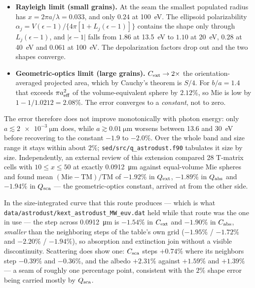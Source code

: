 \documentclass{my_memo}
\begin{document}
\begin{itemize}
  \item \textbf{Rayleigh limit (small grains).} At the seam the
        smallest populated radius has $x = 2\pi a/\lambda = 0.033$, and
        only $0.24$ at \SI{100}{\electronvolt}. The ellipsoid
        polarizability
        $\alpha_j = V(\epsilon-1)/\{4\pi[1+L_j(\epsilon-1)]\}$ contains
        the shape only through $L_j(\epsilon-1)$, and $|\epsilon-1|$
        falls from $1.86$ at \SI{13.5}{\electronvolt} to $1.10$ at
        \SI{20}{\electronvolt}, $0.28$ at \SI{40}{\electronvolt} and
        $0.061$ at \SI{100}{\electronvolt}. The depolarization factors
        drop out and the two shapes converge.
  \item \textbf{Geometric-optics limit (large grains).}
        $C_{\rm ext}\to2\times$ the orientation-averaged projected
        area, which by Cauchy's theorem is $S/4$. For $b/a = 1.4$ that
        exceeds $\pi a_{\rm eff}^2$ of the volume-equivalent sphere by
        $2.12\%$, so Mie is low by $1-1/1.0212 = 2.08\%$. The error
        converges to a \emph{constant}, not to zero.
\end{itemize}

\noindent The error therefore does not improve monotonically with
photon energy: only $a\lesssim\SI{2e-3}{\micro\meter}$ does, while
$a\gtrsim\SI{0.01}{\micro\meter}$ worsens between 13.6 and
\SI{30}{\electronvolt} before recovering to the constant $-1.9$ to
$-2.0\%$. Over the whole band and size range it stays within about
$2\%$; \texttt{sed/src/q\_astrodust.f90} tabulates it size by size.
Independently, an external review of this extension compared 28
T-matrix cells with $10\le x\le50$ at exactly
\SI{0.0912}{\micro\meter} against equal-volume Mie spheres and found
mean $(\mathrm{Mie}-\mathrm{TM})/\mathrm{TM}$ of $-1.92\%$ in
$Q_{\rm ext}$, $-1.89\%$ in $Q_{\rm abs}$ and $-1.94\%$ in
$Q_{\rm sca}$ --- the geometric-optics constant, arrived at from the
other side.

In the size-integrated curve that this route produces --- which is what
\texttt{data/astrodust/kext\_astrodust\_MW\_euv.dat} held while that route was the
one in use --- the step across
\SI{0.0912}{\micro\meter} is $-1.54\%$ in $C_{\rm ext}$ and $-1.90\%$
in $C_{\rm abs}$, \emph{smaller} than the neighboring steps of the
table's own grid ($-1.95\%$ / $-1.72\%$ and $-2.20\%$ / $-1.94\%$), so
absorption and extinction join without a visible discontinuity.
Scattering does show one: $C_{\rm sca}$ steps $+0.74\%$ where its
neighbors step $-0.39\%$ and $-0.36\%$, and the albedo $+2.31\%$
against $+1.59\%$ and $+1.39\%$ --- a seam of roughly one percentage
point, consistent with the $2\%$ shape error being carried mostly by
$Q_{\rm sca}$.
\end{document}
